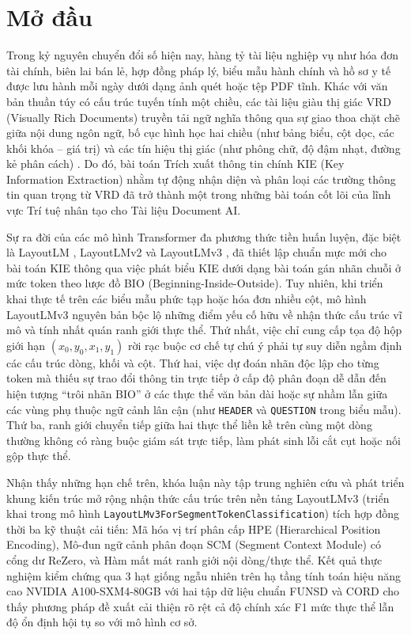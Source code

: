 \chapter*{Mở đầu}
Trong kỷ nguyên chuyển đổi số hiện nay, hàng tỷ tài liệu nghiệp vụ như hóa đơn tài chính, biên lai bán lẻ, hợp đồng pháp lý, biểu mẫu hành chính và hồ sơ y tế được lưu hành mỗi ngày dưới dạng ảnh quét hoặc tệp PDF tĩnh. Khác với văn bản thuần túy có cấu trúc tuyến tính một chiều, các tài liệu giàu thị giác VRD (Visually Rich Documents) truyền tải ngữ nghĩa thông qua sự giao thoa chặt chẽ giữa nội dung ngôn ngữ, bố cục hình học hai chiều (như bảng biểu, cột dọc, các khối khóa -- giá trị) và các tín hiệu thị giác (như phông chữ, độ đậm nhạt, đường kẻ phân cách) \cite{cui2021document, huang2022layoutlmv3}. Do đó, bài toán Trích xuất thông tin chính KIE (Key Information Extraction) nhằm tự động nhận diện và phân loại các trường thông tin quan trọng từ VRD đã trở thành một trong những bài toán cốt lõi của lĩnh vực Trí tuệ nhân tạo cho Tài liệu Document AI.

Sự ra đời của các mô hình Transformer đa phương thức tiền huấn luyện, đặc biệt là LayoutLM \cite{xu2020layoutlm}, LayoutLMv2 \cite{xu2021layoutlmv2} và LayoutLMv3 \cite{huang2022layoutlmv3}, đã thiết lập chuẩn mực mới cho bài toán KIE thông qua việc phát biểu KIE dưới dạng bài toán gán nhãn chuỗi ở mức token theo lược đồ BIO (Beginning-Inside-Outside). Tuy nhiên, khi triển khai thực tế trên các biểu mẫu phức tạp hoặc hóa đơn nhiều cột, mô hình LayoutLMv3 nguyên bản bộc lộ những điểm yếu cố hữu về nhận thức cấu trúc vĩ mô và tính nhất quán ranh giới thực thể. Thứ nhất, việc chỉ cung cấp tọa độ hộp giới hạn $(x_0, y_0, x_1, y_1)$ rời rạc buộc cơ chế tự chú ý phải tự suy diễn ngầm định các cấu trúc dòng, khối và cột. Thứ hai, việc dự đoán nhãn độc lập cho từng token mà thiếu sự trao đổi thông tin trực tiếp ở cấp độ phân đoạn dễ dẫn đến hiện tượng ``trôi nhãn BIO'' ở các thực thể văn bản dài hoặc sự nhầm lẫn giữa các vùng phụ thuộc ngữ cảnh lân cận (như \texttt{HEADER} và \texttt{QUESTION} trong biểu mẫu). Thứ ba, ranh giới chuyển tiếp giữa hai thực thể liền kề trên cùng một dòng thường không có ràng buộc giám sát trực tiếp, làm phát sinh lỗi cắt cụt hoặc nối gộp thực thể.

Nhận thấy những hạn chế trên, khóa luận này tập trung nghiên cứu và phát triển khung kiến trúc mở rộng nhận thức cấu trúc trên nền tảng LayoutLMv3 (triển khai trong mô hình \texttt{LayoutLMv3ForSegmentTokenClassification}) tích hợp đồng thời ba kỹ thuật cải tiến: Mã hóa vị trí phân cấp HPE (Hierarchical Position Encoding), Mô-đun ngữ cảnh phân đoạn SCM (Segment Context Module) có cổng dư ReZero, và Hàm mất mát ranh giới nội dòng/thực thể. Kết quả thực nghiệm kiểm chứng qua 3 hạt giống ngẫu nhiên trên hạ tầng tính toán hiệu năng cao NVIDIA A100-SXM4-80GB với hai tập dữ liệu chuẩn FUNSD \cite{jaume2019funsd} và CORD \cite{park2019cord} cho thấy phương pháp đề xuất cải thiện rõ rệt cả độ chính xác F1 mức thực thể lẫn độ ổn định hội tụ so với mô hình cơ sở.

